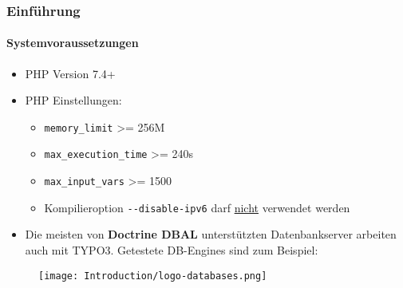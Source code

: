 %

\begin{frame}[fragile]
	\frametitle{Einführung}
	\framesubtitle{Systemvoraussetzungen}

	\begin{itemize}
		\item PHP Version 7.4+
		\item PHP Einstellungen:

			\begin{itemize}
				\item \texttt{memory\_limit} >= 256M
				\item \texttt{max\_execution\_time} >= 240s
				\item \texttt{max\_input\_vars} >= 1500
				\item Kompilieroption \texttt{-}\texttt{-disable-ipv6} darf \underline{nicht} verwendet werden
			\end{itemize}

		\item Die meisten von \textbf{Doctrine DBAL} unterstützten Datenbankserver arbeiten auch mit TYPO3.
			Getestete DB-Engines sind zum Beispiel:
	\end{itemize}

	\begin{figure}
		\texttt{[image: Introduction/logo-databases.png]}
	\end{figure}

\end{frame}


